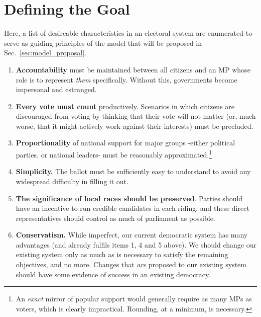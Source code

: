 \documentclass[DIV=calc, paper=a4, fontsize=11pt, twocolumn]{scrartcl}	 %
\begin{document}
\section{Defining the Goal}
\label{sec:goal_list}

Here, a list of desireable characteristics in an electoral system are enumerated to serve as guiding principles of the model that will be proposed in Sec.~\ref{sec:model_proposal}.  
\begin{enumerate}
\item \textbf{Accountability} must be maintained between all citizens and an MP whose role is to represent \emph{them} specifically. Without this, governments become impersonal and estranged.
\item \textbf{Every vote must count} productively. Scenarios in which citizens are discouraged from voting by thinking that their vote will not matter (or, much worse, that it might actively work against their interests) must be precluded.
\item \textbf{Proportionality} of national support for major groups \--either political parties, or national leaders\-- must be reasonably approximated.\footnote{
An \emph{exact} mirror of popular support would generally require as many MPs as voters, which is clearly impractical. Rounding, at a minimum, is necessary.
}
\item   \textbf{Simplicity.} The ballot must be sufficiently easy to understand to avoid any widespread difficulty in filling it out. 

\item  \textbf{The significance of local races should be preserved}. Parties should have an incentive to run credible candidates in each riding, and these direct representatives should control as much of parliament as possible.
\item \textbf{Conservatism.} While imperfect, our current democratic system has many advantages (and already fulfils items 1, 4 and 5 above). We should change our existing system only as much as is necessary to satisfy the remaining objectives, and no more. Changes that \emph{are} proposed to our existing system should have some evidence of success in an existing democracy.
\end{enumerate}

\end{document}
